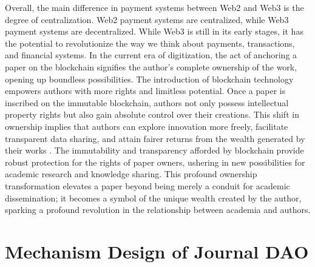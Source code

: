 \documentclass[lettersize,journal]{IEEEtran}
\begin{document}
Overall, the main difference in payment systems between Web2 and Web3 is the degree of centralization. Web2 payment systems are centralized, while Web3 payment systems are decentralized. While Web3 is still in its early stages, it has the potential to revolutionize the way we think about payments, transactions, and financial systems.
In the current era of digitization, the act of anchoring a paper on the blockchain signifies the author's complete ownership of the work, opening up boundless possibilities. The introduction of blockchain technology empowers authors with more rights and limitless potential. Once a paper is inscribed on the immutable blockchain, authors not only possess intellectual property rights but also gain absolute control over their creations. This shift in ownership implies that authors can explore innovation more freely, facilitate transparent data sharing, and attain fairer returns from the wealth generated by their works \cite{wang2023decentralized}. The immutability and transparency afforded by blockchain provide robust protection for the rights of paper owners, ushering in new possibilities for academic research and knowledge sharing. This profound ownership transformation elevates a paper beyond being merely a conduit for academic dissemination; it becomes a symbol of the unique wealth created by the author, sparking a profound revolution in the relationship between academia and authors.




  
\section{Mechanism Design of Journal DAO \label{sec:mechanism}}
\end{document}
